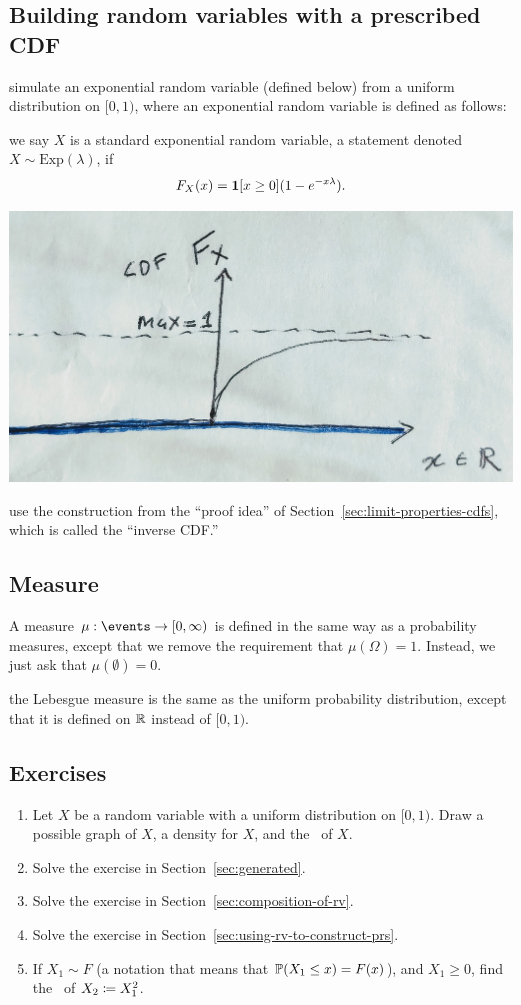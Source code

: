 \documentclass{article}
\begin{document}
\subsection{Building random variables with a prescribed CDF}\label{sec:inverse-cdf}

 simulate an exponential random variable (defined below) from a uniform distribution on $[0, 1)$, where an exponential random variable is defined as follows:

 we say $X$ is a standard exponential random variable, a statement denoted $X \sim \text{Exp}(\lambda)$, if \[F_X(x) = \1[x \ge 0] (1 - e^{-x \lambda}). \]
\begin{center}
	\includegraphics[width=0.4\linewidth]{figures/cdf-exp}
\end{center}

 use the construction from the ``proof idea'' of Section~\ref{sec:limit-properties-cdfs}, which is called the ``inverse CDF.''


\subsection{Measure}

A measure $\mu : \events \to [0, \infty)$ is defined in the same way as a probability measures, except that we remove the requirement that $\mu(\Omega) = 1$. Instead, we just ask that $\mu(\emptyset) = 0$.

 the Lebesgue measure is the same as the uniform probability distribution, except that it is defined on $\R$ instead of $[0, 1)$. 


\subsection{Exercises}

\begin{enumerate}
  \item Let $X$ be a random variable with a uniform distribution on $[0, 1)$. Draw a possible graph of $X$, a density for $X$, and the \CDF\ of $X$.
  \item Solve the exercise in Section~\ref{sec:generated}.
  \item Solve the exercise in Section~\ref{sec:composition-of-rv}.
  \item Solve the exercise in Section~\ref{sec:using-rv-to-construct-prs}.
  \item If $X_1 \sim F$ (a notation that means that $\P(X_1 \le x) = F(x)$), and $X_1 \ge 0$, find the \CDF\ of $X_2 \defeq X_1^2$.
\end{enumerate}
 
\end{document}

